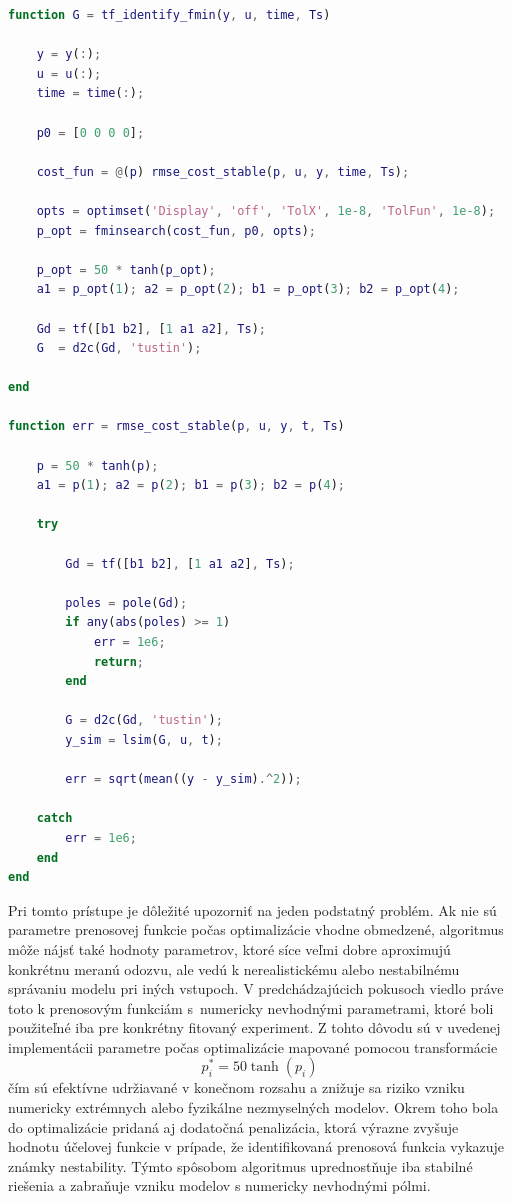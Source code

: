 \begin{lstlisting}[language=Matlab,
caption={MATLAB implementácia identifikácie pomocou optimalizácie prenosovej funkcie},
label={lst:tf_identify_fmin}]
function G = tf_identify_fmin(y, u, time, Ts)

    y = y(:);
    u = u(:);
    time = time(:);

    p0 = [0 0 0 0];

    cost_fun = @(p) rmse_cost_stable(p, u, y, time, Ts);

    opts = optimset('Display', 'off', 'TolX', 1e-8, 'TolFun', 1e-8);
    p_opt = fminsearch(cost_fun, p0, opts);

    p_opt = 50 * tanh(p_opt);
    a1 = p_opt(1); a2 = p_opt(2); b1 = p_opt(3); b2 = p_opt(4);

    Gd = tf([b1 b2], [1 a1 a2], Ts);
    G  = d2c(Gd, 'tustin');

end

function err = rmse_cost_stable(p, u, y, t, Ts)

    p = 50 * tanh(p);
    a1 = p(1); a2 = p(2); b1 = p(3); b2 = p(4);

    try

        Gd = tf([b1 b2], [1 a1 a2], Ts);

        poles = pole(Gd);
        if any(abs(poles) >= 1)
            err = 1e6;
            return;
        end

        G = d2c(Gd, 'tustin');
        y_sim = lsim(G, u, t);

        err = sqrt(mean((y - y_sim).^2));

    catch
        err = 1e6;
    end
end
\end{lstlisting}

Pri tomto prístupe je dôležité upozorniť na jeden podstatný problém.  
Ak nie sú parametre prenosovej funkcie počas optimalizácie vhodne obmedzené,  
algoritmus môže nájsť také hodnoty parametrov, ktoré síce veľmi dobre aproximujú konkrétnu meranú odozvu,  
ale vedú k nerealistickému alebo nestabilnému správaniu modelu pri iných vstupoch.  
V predchádzajúcich pokusoch viedlo práve toto k prenosovým funkciám s~numericky nevhodnými parametrami,  
ktoré boli použiteľné iba pre konkrétny fitovaný experiment.
Z tohto dôvodu sú v uvedenej implementácii parametre počas optimalizácie mapované pomocou transformácie
\begin{equation}
	p_i^\ast = 50 \tanh(p_i)
	\label{eq:param_transform_extended}
\end{equation}
čím sú efektívne udržiavané v konečnom rozsahu a znižuje sa riziko vzniku numericky extrémnych alebo fyzikálne nezmyselných modelov.  
Okrem toho bola do optimalizácie pridaná aj dodatočná penalizácia, ktorá výrazne zvyšuje hodnotu účelovej funkcie v prípade,  
že identifikovaná prenosová funkcia vykazuje známky nestability.  
Týmto spôsobom algoritmus uprednostňuje iba stabilné riešenia a zabraňuje vzniku modelov s numericky nevhodnými pólmi.




